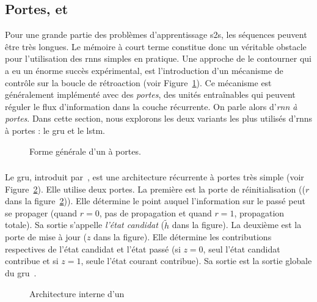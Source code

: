 \subsection{Portes,  et }

Pour une grande partie des problèmes d'apprentissage \gls{s2s}, les séquences peuvent être très longues.
Le mémoire à court terme constitue donc un véritable obstacle pour l'utilisation des \glspl{rnn} simples en pratique.
Une approche de le contourner qui a eu un énorme succès expérimental, 
est l'introduction d'un mécanisme de contrôle sur la boucle de rétroaction (voir Figure~\ref{fig.rnn-gate}).
Ce mécanisme est généralement implémenté avec des \emph{portes},
des unités entraînables qui peuvent réguler le flux d'information dans la couche récurrente.
On parle alors d'\emph{\gls{rnn} à portes}.
Dans cette section, nous explorons les deux variants les plus utilisés d'\glspl{rnn} à portes :
le \gls{gru} et le \gls{lstm}. 


\begin{figure}[htb]
    \centering
    \resizebox{8cm}{!}{}
    \caption{Forme générale d'un  à portes.}
    \label{fig.rnn-gate}
\end{figure}

\subsubsection{}

Le \gls{gru}, introduit par~\cite{Cho_van_Merrienboer_Bahdanau_Bengio_2014}, 
est une architecture récurrente à portes très simple (voir Figure~\ref{fig.gru-circuit}).
Elle utilise deux portes.
La première est la porte de réinitialisation ((\(r\) dans la figure~\ref{fig.gru-circuit})).
Elle détermine le point auquel l'information sur le passé peut se propager
(quand \(r=0\), pas de propagation et quand \(r=1\), propagation totale).
Sa sortie s'appelle \emph{l'état candidat} (\(\tilde{h}\) dans la figure).
La deuxième est la porte de mise à jour (\(z\) dans la figure).
Elle détermine les contributions respectives de l'état candidat et l'état passé
(si \(z=0\), seul l'état candidat contribue et si \(z=1\), seule l'état courant contribue).
Sa sortie est la sortie globale du \gls{gru}~\cite{Cho_van_Merrienboer_Bahdanau_Bengio_2014}.


\begin{figure}[htb]
    \centering
    \resizebox{8cm}{!}{}
    \caption[Architecture interne d'un ]%
    {Architecture interne d'un ~\cite[Fig. 1b]{Chung_Gulcehre_Cho_Bengio_2014}}
    \label{fig.gru-circuit}
\end{figure}

